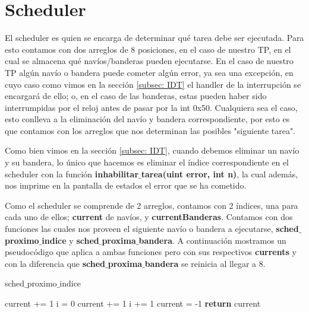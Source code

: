 \section{Scheduler}
\par{El scheduler es quien se encarga de determinar qué tarea debe ser ejecutada. Para esto contamos con dos arreglos de 8 posiciones, en el caso de nuestro TP, en el cual se almacena qué navíos/banderas pueden ejecutarse. En el caso de nuestro TP algún navío o bandera puede cometer algún error, ya sea una excepción, en cuyo caso como vimos en la sección \ref{subsec: IDT} el handler de la interrupción se encargará de ello; o, en el caso de las banderas, estas pueden haber sido interrumpidas por el reloj antes de pasar por la int 0x50. Cualquiera sea el caso, esto conlleva a la eliminación del navío y bandera correspondiente, por esto es que contamos con los arreglos que nos determinan las posibles "siguiente tarea".}
\par{
Como bien vimos en la sección \ref{subsec: IDT}, cuando debemos eliminar un navío y su bandera, lo único que hacemos es eliminar el índice correspondiente en el scheduler con la función \textbf{inhabilitar$\_$tarea(uint error, int n)}, la cual además, nos imprime en la pantalla de estados el error que se ha cometido.
}
\par{Como el scheduler se comprende de 2 arreglos, contamos con 2 índices, una para cada uno de ellos; \textbf{current} de navíos, y \textbf{currentBanderas}. Contamos con dos funciones las cuales nos proveen el siguiente navío o bandera a ejecutarse, \textbf{sched$\_$proximo$\_$indice} y \textbf{sched$\_$proxima$\_$bandera}. A continuación mostramos un pseudocódigo que aplica a ambas funciones pero con sus respectivos \textbf{currents} y con la diferencia que \textbf{sched$\_$proxima$\_$bandera} se reinicia al llegar a 8.}

\begin{algorithm}[h!]
\caption{sched$\_$proximo$\_$indice}
\begin{algorithmic}
	\State current += 1
	\State i = 0
		\State current += 1
		\State i += 1
	\EndWhile
	\State current = -1
	\EndIf
	\State \textbf{return} current
\end{algorithmic}
\end{algorithm}

